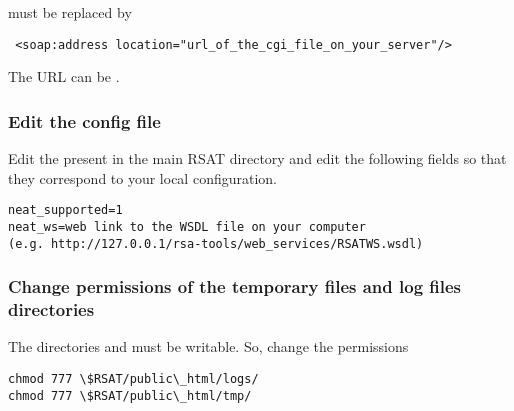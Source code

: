 \documentclass{book}
\begin{document}
must be replaced by

\begin{lstlisting}
 <soap:address location="url_of_the_cgi_file_on_your_server"/>
\end{lstlisting}

The URL can be .

\subsubsection{Edit the \neat config file}

Edit the  present in the main RSAT directory and edit the following fields so that they correspond to your local configuration.

\begin{lstlisting}
neat_supported=1
neat_ws=web link to the WSDL file on your computer
(e.g. http://127.0.0.1/rsa-tools/web_services/RSATWS.wsdl)
\end{lstlisting}

\subsubsection{Change permissions of the temporary files and log files directories}

The directories  and  must be writable. So, change the permissions

\begin{lstlisting}
chmod 777 \$RSAT/public\_html/logs/
chmod 777 \$RSAT/public\_html/tmp/
\end{lstlisting}
\end{document}
